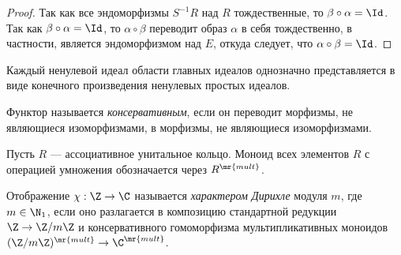 \documentclass[
	extrafontsizes,
	11pt,
	hyphens,
]{memoir}
\begin{document}
\begin{proof}
Так как все эндоморфизмы \(S^{-1}R\) над \(R\) тождественные, то \(\beta \circ \alpha = \Id\).
Так как \(\beta \circ \alpha = \Id\), то \(\alpha \circ \beta\) переводит образ \(\alpha\) в себя тождественно, в частности, является эндоморфизмом над \(E\), откуда следует, что \(\alpha \circ \beta = \Id\).
\end{proof}

\begin{theorem}
Каждый ненулевой идеал области главных идеалов однозначно представляется в виде конечного произведения ненулевых простых идеалов.
\end{theorem}

\begin{definition}
Функтор называется \emph{консервативным}, если он переводит
морфизмы, не являющиеся изоморфизмами, в морфизмы, не являющиеся изоморфизмами.
\end{definition}

\begin{notation}
Пусть \(R\) --- ассоциативное унитальное кольцо.
Моноид всех элементов \(R\) с операцией умножения обозначается через \(R^\mr{mult}\).
\end{notation}

\begin{definition}
Отображение \(\chi: \Z \to \C\) называется \emph{характером Дирихле} модуля \(m\), где \(m \in \N_1\), если оно разлагается в композицию стандартной редукции \(\Z \to \Z/m\Z\) и консервативного гомоморфизма мультипликативных моноидов \((\Z/m\Z)^\mr{mult} \to \C^\mr{mult}\).
\end{definition}
\end{document}
